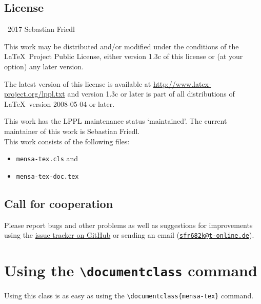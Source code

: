 \documentclass[11pt]{ltxdoc}
\begin{document}
	\subsection*{License}
	\begin{small}
		\textcopyright\ 2017 Sebastian Friedl
		
		\smallskip
		This work may be distributed and/or modified under the conditions of the \LaTeX\ Project Public License, either version 1.3c of this license or (at your option) any later version.
		
		\smallskip
		The latest version of this license is available at \url{http://www.latex-project.org/lppl.txt} and version 1.3c or later is part of all distributions of \LaTeX\ version 2008-05-04 or later.
		
		\smallskip
		This work has the LPPL maintenance status \enquote*{maintained}. The current maintainer of this work is Sebastian Friedl. \\
		This work consists of the following files:
		\begin{itemize} \itemsep 0pt
			\item \texttt{mensa-tex.cls} and
			\item \texttt{mensa-tex-doc.tex}
		\end{itemize}
	\end{small}


	\subsection*{Call for cooperation}
	Please report bugs and other problems as well as suggestions for improvements using the \href{https://github.com/SFr682k/mensa-tex/issues}{issue tracker on GitHub} or sending an email (\href{mailto:sfr682k@t-online.de}{\texttt{sfr682k@t-online.de}}).


	\clearpage
	
		
		
	
	\section{Using the \texttt{\textbackslash documentclass} command} \label{sec:docclass}
	Using this class is as easy as using the \verb|\documentclass{mensa-tex}| command.
	
\end{document}
